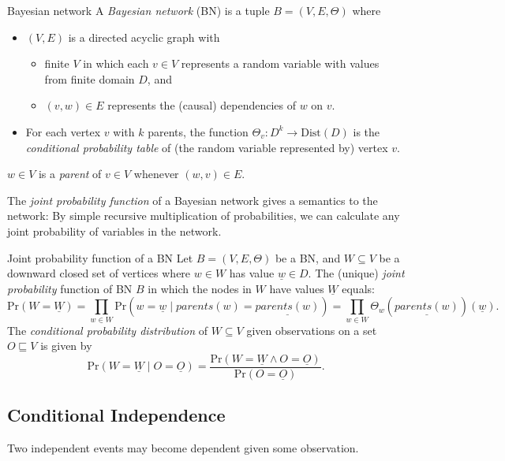 \documentclass[english]{panikzettel}
\newcommand{\Dist}{\mathrm{Dist}}
\renewcommand{\Pr}{\mathrm{Pr}}
\begin{document}
\begin{defi}{Bayesian network}
    A \emph{Bayesian network} (BN) is a tuple $B=(V,E,\Theta)$ where
    \begin{itemize}
        \item $(V,E)$ is a directed acyclic graph with
            \begin{itemize}
                \item finite $V$ in which each $v \in V$ represents a random variable with values from finite domain $D$, and
                \item $(v,w) \in E$ represents the (causal) dependencies of $w$ on $v$.
            \end{itemize}
        \item For each vertex $v$ with $k$ parents, the function $\Theta_v: D^k \to \Dist(D)$ is the \emph{conditional probability table} of (the random variable represented by) vertex $v$.
    \end{itemize}
    $w \in V$ is a \emph{parent} of $v \in V$ whenever $(w,v) \in E$.
\end{defi}

The \emph{joint probability function} of a Bayesian network gives a semantics to the network: By simple recursive multiplication of probabilities, we can calculate any joint probability of variables in the network.

\begin{defi}{Joint probability function of a BN}
    Let $B=(V,E,\Theta)$ be a BN, and $W \subseteq V$ be a downward closed set of vertices where $w \in W$ has value $\underline{w} \in D$. The (unique) \emph{joint probability} function of BN $B$ in which the nodes in $W$ have values $\underline{W}$ equals:
    $$\Pr(W=\underline{W})= \prod_{w \in W} \Pr(w = \underline{w} \mid parents(w)=\underline{parents(w)})=\prod_{w \in W} \Theta_w(\underline{parents(w)})(\underline{w}).$$
    The \emph{conditional probability distribution} of $W \subseteq V$ given observations on a set $O \sqsubseteq V$ is given by $$\Pr(W= \underline{W} \mid O = \underline{O})=\frac{\Pr(W= \underline{W} \land O = \underline{O})}{\Pr(O= \underline{O})}.$$
\end{defi}

\subsection{Conditional Independence}

Two independent events may become dependent given some observation.
\end{document}
